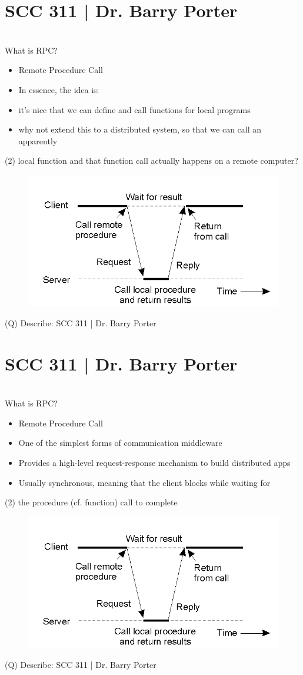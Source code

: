 \documentclass[12pt]{article}
\begin{document}
\section{SCC 311 | Dr. Barry Porter}
\\
What is RPC?\\
\begin{itemize}
  \item Remote Procedure Call
  \item In essence, the idea is:
  \item it's nice that we can define and call functions for local programs
  \item why not extend this to a distributed system, so that we can call an apparently 
\end{itemize}(2)
local function and that function call actually happens on a remote computer?\\
\begin{figure}[H]
\includegraphics[width=0.5\linewidth]{page9-image-1.png}
\end{figure}
\clearpage
(Q)
Describe: SCC 311 | Dr. Barry Porter
\clearpage
\section{SCC 311 | Dr. Barry Porter}
\\
What is RPC?\\
\begin{itemize}
  \item Remote Procedure Call
  \item One of the simplest forms of communication middleware
  \item Provides a high-level request-response mechanism to build distributed apps
  \item Usually synchronous, meaning that the client blocks while waiting for 
\end{itemize}(2)
the procedure (cf. function) call to complete\\
\begin{figure}[H]
\includegraphics[width=0.5\linewidth]{page10-image-1.png}
\end{figure}
\clearpage
(Q)
Describe: SCC 311 | Dr. Barry Porter
\clearpage
\end{document}

